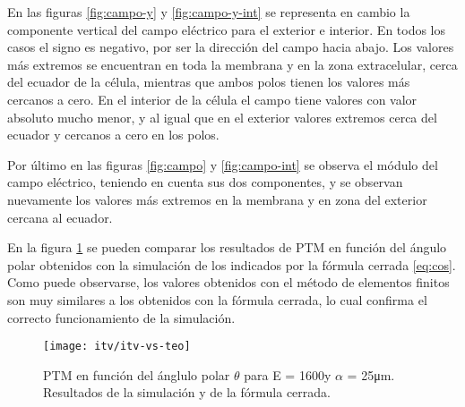 En las figuras \ref{fig:campo-y} y \ref{fig:campo-y-int} se representa en cambio la componente vertical del campo eléctrico para el exterior e interior. En todos los casos el signo es negativo, por ser la dirección del campo hacia abajo. Los valores más extremos se encuentran en toda la membrana y en la zona extracelular, cerca del ecuador de la célula, mientras que ambos polos tienen los valores más cercanos a cero. En el interior de la célula el campo tiene valores con valor absoluto mucho menor, y al igual que en el exterior valores extremos cerca del ecuador y cercanos a cero en los polos.


Por último en las figuras \ref{fig:campo} y \ref{fig:campo-int} se observa el módulo del campo eléctrico, teniendo en cuenta sus dos componentes, y se observan nuevamente los valores más extremos en la membrana y en zona del exterior cercana al ecuador.

En la figura \ref{fig:itv-vs-teo} se pueden comparar los resultados de PTM en función del ángulo polar obtenidos con la simulación de los indicados por la fórmula cerrada \ref{eq:cos}. Como puede observarse, los valores obtenidos con el método de elementos finitos son muy similares a los obtenidos con la fórmula cerrada, lo cual confirma el correcto funcionamiento de la simulación. 

\clearpage






\begin{figure}
	\texttt{[image: itv/itv-vs-teo]}
	\caption{PTM en función del ánglulo polar $\theta$ para E = 1600\vcm y $\alpha$ = 25\si{\micro\metre}. Resultados de la simulación y de la fórmula cerrada.}
	\label{fig:itv-vs-teo}
\end{figure}

